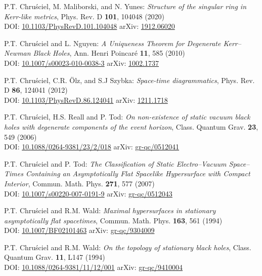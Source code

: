 \begin{thebibliography}{123}
P.T. Chru\'sciel, M. Maliborski, and N. Yunes:
{\em Structure of the singular ring in Kerr-like metrics},
Phys. Rev. D {\bf 101}, 104048 (2020)\\
DOI: \href{https://doi.org/10.1103/PhysRevD.101.104048}{10.1103/PhysRevD.101.104048}\hfill
arXiv: \href{https://arxiv.org/abs/1912.06020}{1912.06020}

P.T. Chru\'sciel and L. Nguyen:
{\em A Uniqueness Theorem for Degenerate Kerr–Newman Black Holes},
Ann. Henri Poincar\'e {\bf 11}, 585 (2010)\\
DOI: \href{https://doi.org/10.1007/s00023-010-0038-3}{10.1007/s00023-010-0038-3}\hfill
arXiv: \href{https://arxiv.org/abs/1002.1737}{1002.1737}

P.T. Chru\'sciel, C.R. Ölz, and S.J Szybka:
{\em Space-time diagrammatics},
Phys. Rev. D {\bf 86}, 124041 (2012)\\
DOI:  \href{https://doi.org/10.1103/PhysRevD.86.124041}{10.1103/PhysRevD.86.124041}\hfill
arXiv: \href{https://arxiv.org/abs/1211.1718}{1211.1718}

P.T. Chru\'sciel, H.S. Reall and P. Tod:
{\em On non-existence of static vacuum black holes with degenerate components of the event horizon},
Class. Quantum Grav. {\bf 23}, 549 (2006)\\
DOI: \href{https://doi.org/10.1088/0264-9381/23/2/018}{10.1088/0264-9381/23/2/018}\hfill
arXiv: \href{https://arxiv.org/abs/gr-qc/0512041}{gr-qc/0512041}

P.T. Chru\'sciel and P. Tod:
{\em The Classification of Static Electro–Vacuum Space–Times Containing an Asymptotically Flat Spacelike Hypersurface with Compact Interior},
Commun. Math. Phys. {\bf 271}, 577 (2007)\\
DOI: \href{https://doi.org/10.1007/s00220-007-0191-9}{10.1007/s00220-007-0191-9}\hfill
arXiv: \href{https://arxiv.org/abs/gr-qc/0512043}{gr-qc/0512043}

P.T. Chru\'sciel and R.M. Wald:
{\em Maximal hypersurfaces in stationary asymptotically flat spacetimes},
Commun. Math. Phys. {\bf 163}, 561 (1994)\\
DOI: \href{https://doi.org/10.1007/BF02101463}{10.1007/BF02101463}\hfill
arXiv: \href{https://arxiv.org/abs/gr-qc/9304009}{gr-qc/9304009}

P.T. Chru\'sciel and R.M. Wald:
{\em On the topology of stationary black holes},
Class. Quantum Grav. {\bf 11}, L147 (1994)\\
DOI: \href{https://doi.org/10.1088/0264-9381/11/12/001}{10.1088/0264-9381/11/12/001}\hfill
arXiv: \href{https://arxiv.org/abs/gr-qc/9410004}{gr-qc/9410004}


\end{thebibliography}
